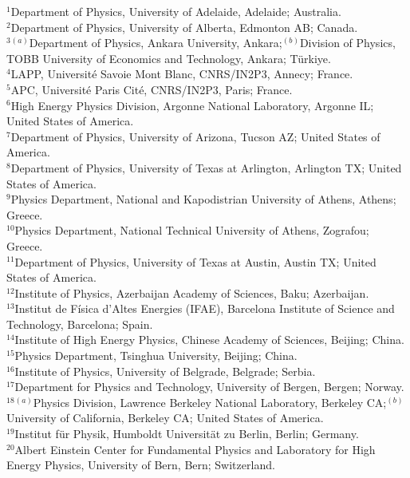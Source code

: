 \begin{flushleft}
$^{1}$Department of Physics, University of Adelaide, Adelaide; Australia.\\
$^{2}$Department of Physics, University of Alberta, Edmonton AB; Canada.\\
$^{3}$$^{(a)}$Department of Physics, Ankara University, Ankara;$^{(b)}$Division of Physics, TOBB University of Economics and Technology, Ankara; T\"urkiye.\\
$^{4}$LAPP, Université Savoie Mont Blanc, CNRS/IN2P3, Annecy; France.\\
$^{5}$APC, Universit\'e Paris Cit\'e, CNRS/IN2P3, Paris; France.\\
$^{6}$High Energy Physics Division, Argonne National Laboratory, Argonne IL; United States of America.\\
$^{7}$Department of Physics, University of Arizona, Tucson AZ; United States of America.\\
$^{8}$Department of Physics, University of Texas at Arlington, Arlington TX; United States of America.\\
$^{9}$Physics Department, National and Kapodistrian University of Athens, Athens; Greece.\\
$^{10}$Physics Department, National Technical University of Athens, Zografou; Greece.\\
$^{11}$Department of Physics, University of Texas at Austin, Austin TX; United States of America.\\
$^{12}$Institute of Physics, Azerbaijan Academy of Sciences, Baku; Azerbaijan.\\
$^{13}$Institut de F\'isica d'Altes Energies (IFAE), Barcelona Institute of Science and Technology, Barcelona; Spain.\\
$^{14}$Institute of High Energy Physics, Chinese Academy of Sciences, Beijing; China.\\
$^{15}$Physics Department, Tsinghua University, Beijing; China.\\
$^{16}$Institute of Physics, University of Belgrade, Belgrade; Serbia.\\
$^{17}$Department for Physics and Technology, University of Bergen, Bergen; Norway.\\
$^{18}$$^{(a)}$Physics Division, Lawrence Berkeley National Laboratory, Berkeley CA;$^{(b)}$University of California, Berkeley CA; United States of America.\\
$^{19}$Institut f\"{u}r Physik, Humboldt Universit\"{a}t zu Berlin, Berlin; Germany.\\
$^{20}$Albert Einstein Center for Fundamental Physics and Laboratory for High Energy Physics, University of Bern, Bern; Switzerland.\\

\end{flushleft}
